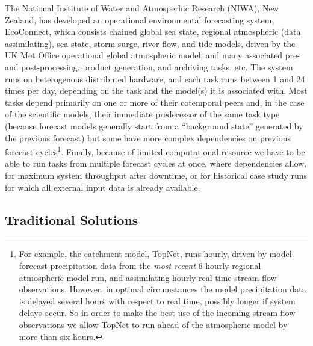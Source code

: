 \documentclass[11pt,a4paper]{article}
\begin{document}
The National Institute of Water and Atmosperhic Research (NIWA), New
Zealand, has developed an operational environmental forecasting system,
EcoConnect, which consists chained global sea state, regional
atmospheric (data assimilating), sea state, storm surge, river flow, and
tide models, driven by the UK Met Office operational global atmospheric
model, and many associated pre- and post-processing, product generation,
and archiving tasks, etc. The system runs on heterogenous distributed
hardware, and each task runs between 1 and 24 times per day, depending
on the task and the model(s) it is associated with. Most tasks depend
primarily on one or more of their cotemporal peers and, in the case of
the scientific models, their immediate predecessor of the same task type
(because forecast models generally start from a ``background state''
generated by the previous forecast) but some have more complex
dependencies on previous forecast cycles\footnote{For example, the
catchment model, TopNet, runs hourly, driven by model forecast
precipitation data from the {\em most recent} 6-hourly regional
atmospheric model run, and assimilating hourly real time stream flow
observations. However, in optimal circumstances the model precipitation
data is delayed several hours with respect to real time, possibly longer
if system delays occur. So in order to make the best use of the incoming
stream flow observations we allow TopNet to run ahead of the atmospheric
model by more than six hours.}.  Finally, because of limited
computational resource we have to be able to run tasks from multiple
forecast cycles at once, where dependencies allow, for maximum system
throughput after downtime, or for historical case study runs for which
all external input data is already available.

\subsection{Traditional Solutions}
\end{document}
